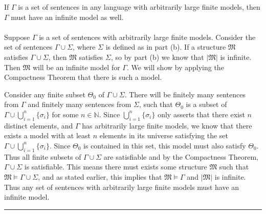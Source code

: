 \documentclass[11pt]{hmcpset}
\newenvironment{problem2}[1]{\noindent {\bf (#1}}
{\medskip}
\newenvironment{proof}{\noindent {\bf Proof:} \\}{\hfill
\rule{1mm}{3mm} \bigskip}
\begin{document}
\begin{problem2}{c)} If $\Gamma$ is a set of sentences in any language with arbitrarily large finite models, then $\Gamma$ must have an infinite model as well.\\
\begin{proof}\indent Suppose $\Gamma$ is a set of sentences with arbitrarily large finite models. Consider the set of sentences $\Gamma\cup\Sigma$, where $\Sigma$ is defined as in part (b). If a structure $\mathfrak{M}$ satisfies $\Gamma\cup\Sigma$, then $\mathfrak{M}$ satisfies $\Sigma$, so by part (b) we know that $|\mathfrak{M}|$ is infinite. Then $\mathfrak{M}$ will be an infinite model for $\Gamma$. We will show by applying the Compactness Theorem that there is such a model.

Consider any finite subset $\Theta_0$ of $\Gamma\cup\Sigma$. There will be finitely many sentences from $\Gamma$ and finitely many sentences from $\Sigma$, such that $\Theta_0$ is a subset of $\Gamma \cup \bigcup_{i=1}^n\{\sigma_i\}$ for some $n\in\mathbb{N}$. Since $\bigcup_{i=1}^n\{\sigma_i\}$ only asserts that there exist $n$ distinct elements, and $\Gamma$ has arbitrarily large finite models, we know that there exists a model with at least $n$ elements in its universe satisfying the set $\Gamma \cup \bigcup_{i=1}^n\{\sigma_i\}$. Since $\Theta_0$ is contained in this set, this model must also satisfy $\Theta_0$. Thus all finite subsets of $\Gamma\cup\Sigma$ are satisfiable and by the Compactness Theorem, $\Gamma\cup\Sigma$ is satisfiable. This means there must exists some structure $\mathfrak{M}$ such that $\mathfrak{M}\vDash\Gamma\cup\Sigma$, and as stated earlier, this implies that $\mathfrak{M}\vDash\Gamma$ and $|\mathfrak{M}|$ is infinite. Thus any set of sentences with arbitrarily large finite models must have an infinite model.
\end{proof}
\end{problem2}
\end{document}
